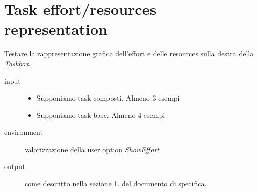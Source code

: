 \section{Task effort/resources representation}
Testare la rappresentazione grafica dell'effort e delle resources sulla destra
della \emph{Taskbox}.
\begin{description}
\item[input]  \quad
\begin{itemize}
  \item Supponiamo task composti. Almeno 3 esempi
  \item Supponiamo task base. Almeno 4 esempi
\end{itemize}
\item[environment] valorizzazione della user option \emph{ShowEffort}
\item[output] come descritto nella sezione 1. del
documento di specifica.
\end{description}


